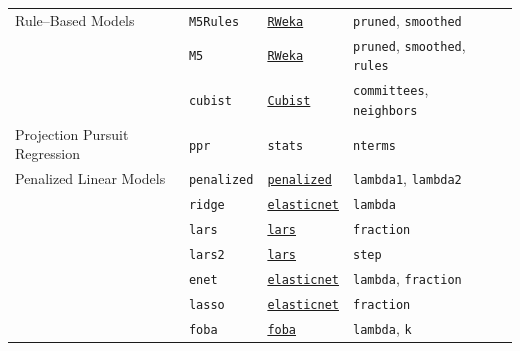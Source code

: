 \documentclass[12pt]{article}
\newcommand{\code}[1]{\mbox{\footnotesize\color{darkblue}\texttt{#1}}}
\begin{document}
\begin{landscape}
\begin{longtable}{lllll}
 \rowcolor[rgb]{.95, .95, .95}   
      Rule--Based Models &
         \code{M5Rules} & 
            {\tt \href{http://cran.r-project.org/web/packages/RWeka/index.html}{RWeka}}    & 
            \code{pruned}, \code{smoothed}   & \\             
            
 \rowcolor[rgb]{.95, .95, .95}   
       &
         \code{M5} & 
            {\tt \href{http://cran.r-project.org/web/packages/RWeka/index.html}{RWeka}}    & 
            \code{pruned}, \code{smoothed}, \code{rules}    & \\   
            
 \rowcolor[rgb]{.95, .95, .95}   
      &
         \code{cubist} & 
            {\tt \href{http://cran.r-project.org/web/packages/Cubist/index.html}{Cubist}}    & 
            \code{committees}, \code{neighbors}  & \\    
            
      Projection Pursuit Regression  &
         \code{ppr} & 
            \code{stats}       & 
            \code{nterms} & \\            
         
\rowcolor[rgb]{.95, .95, .95}               
      Penalized Linear Models  &
         \code{penalized} & 
             {\tt \href{http://cran.r-project.org/web/packages/penalized/index.html}{penalized}}      & 
            \code{lambda1}, \code{lambda2} &  \\     
\rowcolor[rgb]{.95, .95, .95}          
       &
         \code{ridge} & 
             {\tt \href{http://cran.r-project.org/web/packages/elasticnet/index.html}{elasticnet}}      & 
            \code{lambda} & \\               
\rowcolor[rgb]{.95, .95, .95}          
       &
         \code{lars} & 
             {\tt \href{http://cran.r-project.org/web/packages/lars/index.html}{lars}}      & 
            \code{fraction} & \\   
\rowcolor[rgb]{.95, .95, .95}               
         &
         \code{lars2} & 
             {\tt \href{http://cran.r-project.org/web/packages/lars/index.html}{lars}}        & 
            \code{step} & \\            
\rowcolor[rgb]{.95, .95, .95}                   
      &
         \code{enet} & 
             {\tt \href{http://cran.r-project.org/web/packages/elasticnet/index.html}{elasticnet}}      & 
            \code{lambda}, \code{fraction} & \\          
\rowcolor[rgb]{.95, .95, .95}   
      &
         \code{lasso} & 
             {\tt \href{http://cran.r-project.org/web/packages/elasticnet/index.html}{elasticnet}}      & 
            \code{fraction} & \\       
\rowcolor[rgb]{.95, .95, .95}         
       &
         \code{foba} & 
             {\tt \href{http://cran.r-project.org/web/packages/foba/index.html}{foba}}       & 
            \code{lambda}, \code{k} & \\    
                              

\end{longtable}
\end{landscape}
\end{document}
